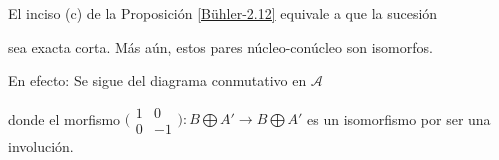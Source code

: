 \documentclass[tesis]{subfiles}
\begin{document}
\begin{Obs}\label{Obs: de Bühler-2.12(c)}
    El inciso (c) de la Proposición \ref{Bühler-2.12} equivale a que la sucesión
    \begin{center}
    \end{center}
    sea exacta corta. Más aún, estos pares núcleo-conúcleo son isomorfos.
    \vspace{1mm}

    En efecto: Se sigue del diagrama conmutativo en $\mathscr{A}$
    \begin{center}
    \end{center}
    donde el morfismo $\big(\begin{smallmatrix} 1 &0 \\ 0 &-1 \end{smallmatrix}\big):B\bigoplus A'\to B\bigoplus A'$ es un isomorfismo por ser una involución.
\end{Obs}
\end{document}
